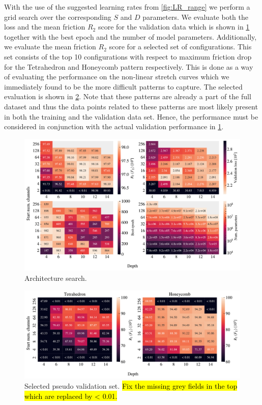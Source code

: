 With the use of the suggested learning rates from \cref{fig:LR_range} we perform
a grid search over the corresponding $S$ and $D$ parameters. We evaluate both
the loss and the mean friction $R_2$ score for the validation data which is shown in \cref{fig:A_search_perf} together with the best epoch and the number of model
parameters. Additionally, we evaluate the mean friction $R_2$ score for a
selected set of configurations. This set consists of the top 10 configurations
with respect to maximum friction drop for the Tetrahedron and Honeycomb pattern
respectively. This is done as a way of evaluating the performance on the
non-linear stretch curves which we immediately found to be the more difficult patterns to capture. The selected evaluation is shown in \cref{fig:A_search_compare}. Note
that these patterns are already a part of the full dataset and thus the data points
related to these patterns are most likely present in both the training and the validation data set. Hence, the performance must be considered in conjunction with the actual validation performance in \cref{fig:A_search_perf}.

\begin{figure}[H]
  \centering
  \includegraphics[width=\linewidth]{figures/ML/A_search_perf.pdf}
  \caption{Architecture search.}
  \label{fig:A_search_perf}
\end{figure}  

\begin{figure}[H]
  \centering
  \includegraphics[width=\linewidth]{figures/ML/A_search_compare_perf}
  \caption{Selected pseudo validation set. \hl{Fix the missing grey fields in the top which are replaced by < 0.01.}}
  \label{fig:A_search_compare}
\end{figure}  

